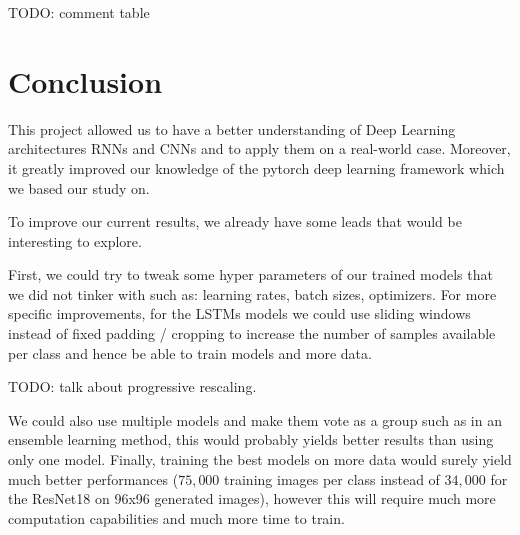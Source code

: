\documentclass[10pt,twocolumn,letterpaper]{article}
\begin{document}
TODO: comment table

\section{Conclusion}

This project allowed us to have a better understanding of Deep Learning architectures RNNs and CNNs and to apply them on a real-world case. Moreover, it greatly improved our knowledge of the pytorch deep learning framework which we based our study on.

To improve our current results, we already have some leads that would be interesting to explore.

First, we could try to tweak some hyper parameters of our trained models that we did not tinker with such as: learning rates, batch sizes, optimizers. For more specific improvements, for the LSTMs models we could use sliding windows instead of fixed padding / cropping to increase the number of samples available per class and hence be able to train models and more data.

TODO: talk about progressive rescaling.

We could also use multiple models and make them vote as a group such as in an ensemble learning method, this would probably yields better results than using only one model. 
Finally, training the best models on more data would surely yield much better performances ($75,000$ training images per class instead of $34,000$ for the ResNet18 on 96x96 generated images), however this will require much more computation capabilities and much more time to train.

{\small


}
\end{document}

